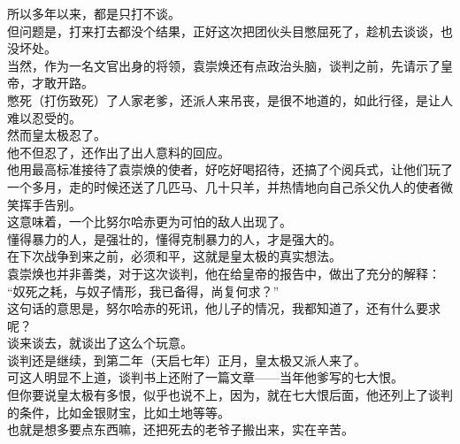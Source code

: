 \begin{multicols}{\theparacolNo}
所以多年以来，都是只打不谈。\\

但问题是，打来打去都没个结果，正好这次把团伙头目憋屈死了，趁机去谈谈，也没坏处。\\

当然，作为一名文官出身的将领，袁崇焕还有点政治头脑，谈判之前，先请示了皇帝，才敢开路。\\

憋死（打伤致死）了人家老爹，还派人来吊丧，是很不地道的，如此行径，是让人难以忍受的。\\

然而皇太极忍了。\\

他不但忍了，还作出了出人意料的回应。\\

他用最高标准接待了袁崇焕的使者，好吃好喝招待，还搞了个阅兵式，让他们玩了一个多月，走的时候还送了几匹马、几十只羊，并热情地向自己杀父仇人的使者微笑挥手告别。\\

这意味着，一个比努尔哈赤更为可怕的敌人出现了。\\

懂得暴力的人，是强壮的，懂得克制暴力的人，才是强大的。\\

在下次战争到来之前，必须和平，这就是皇太极的真实想法。\\

袁崇焕也并非善类，对于这次谈判，他在给皇帝的报告中，做出了充分的解释：\\

“奴死之耗，与奴子情形，我已备得，尚复何求？”\\

这句话的意思是，努尔哈赤的死讯，他儿子的情况，我都知道了，还有什么要求呢？\\

谈来谈去，就谈出了这么个玩意。\\

谈判还是继续，到第二年（天启七年）正月，皇太极又派人来了。\\

可这人明显不上道，谈判书上还附了一篇文章——当年他爹写的七大恨。\\

但你要说皇太极有多恨，似乎也说不上，因为，就在七大恨后面，他还列上了谈判的条件，比如金银财宝，比如土地等等。\\

也就是想多要点东西嘛，还把死去的老爷子搬出来，实在辛苦。\\


\end{multicols}
